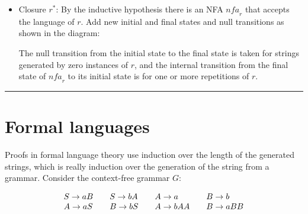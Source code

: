 \documentclass[11pt,a4paper]{report}
\newcommand*{\qed}{\hfill\rule{1ex}{1.5ex}}
\newcommand*{\qedd}[1]{\vspace*{-#1ex}\qed}
\begin{document}
\begin{itemize}
\item Closure $r^*$: By the inductive hypothesis there is an NFA $\mathit{nfa}_r$ that accepts the language of $r$. Add new initial and final states and null transitions as shown in the diagram:
\begin{center}
\end{center}
The null transition from the initial state to the final state is taken for strings generated by zero instances of $r$, and the internal transition from the final state of $\mathit{nfa}_r$ to its initial state is for one or more repetitions of $r$.
\end{itemize}
\qedd{5}

\section{Formal languages}

Proofs in formal language theory use induction over the length of the generated strings, which is really induction over the generation of the string from a grammar. Consider the context-free grammar $G$:

\begin{displaymath}
\begin{array}{l@{\hspace{2em}}l@{\hspace{2em}}l@{\hspace{2em}}l}
S \rightarrow aB & S \rightarrow bA & A \rightarrow a & B \rightarrow b \\
A \rightarrow aS & B \rightarrow bS & A \rightarrow bAA & B \rightarrow aBB\\
\end{array}
\end{displaymath}
\end{document}
